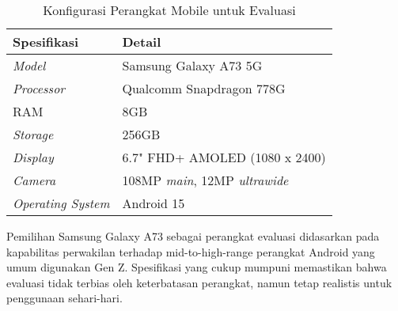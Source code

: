 \begin{table}[h!]
    \centering
    \caption{Konfigurasi Perangkat Mobile untuk Evaluasi}
    \label{tab:mobile-config}
    \begin{tabularx}{\linewidth}{|p{4cm}|X|}
        \hline
        \textbf{Spesifikasi} & \textbf{Detail} \\
        \hline
        \textit{Model} & Samsung Galaxy A73 5G \\
        \hline
        \textit{Processor} & Qualcomm Snapdragon 778G \\
        \hline
        RAM & 8GB \\
        \hline
        \textit{Storage} & 256GB \\
        \hline
        \textit{Display} & 6.7" FHD+ AMOLED (1080 x 2400) \\
        \hline
        \textit{Camera} & 108MP \textit{main}, 12MP \textit{ultrawide} \\
        \hline
        \textit{Operating System} & Android 15 \\
        \hline
    \end{tabularx}
\end{table}

Pemilihan Samsung Galaxy A73 sebagai perangkat evaluasi didasarkan pada kapabilitas perwakilan terhadap mid-to-high-range perangkat Android yang umum digunakan Gen Z. Spesifikasi yang cukup mumpuni memastikan bahwa evaluasi tidak terbias oleh keterbatasan perangkat, namun tetap realistis untuk penggunaan sehari-hari.
